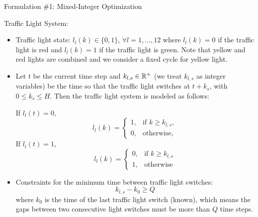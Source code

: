 \documentclass[9pt]{beamer}
\begin{document}
\begin{frame}{Formulation \#1: Mixed-Integer Optimization}

Traffic Light System:

\begin{itemize}
\item Traffic light state: $l_l(k) \in \{0, 1\}$, $\forall l = 1, \dots, 12$ where $l_l(k) = 0$ if the traffic light is red and $l_l(k) = 1$ if the traffic light is green.
Note that yellow and red lights are combined and we consider a fixed cycle for yellow light. 


\item Let $t$ be the current time step and $k_{l,s} \in \mathbb{R}^{+}$ (we treat $k_{l,s}$ as integer variables) be the time so that the traffic light switches at $t+k_s$, with $0 \le k_s \le H$. Then the traffic light system is modeled as follows:

If $l_l(t) = 0$,
\begin{equation*}
l_l (k) =
\begin{cases}
1, & \text{if } k \ge k_{l,s}, \\
0, & \text{otherwise,}
\end{cases}     
\end{equation*}
If $l_l(t) = 1$,
\begin{equation*}
l_l (k) =
\begin{cases}
0, & \text{if } k \ge k_{l,s} \\
1, & \text{otherwise}
\end{cases}     
\end{equation*}

\item Constraints for the minimum time between traffic light switches:
\begin{equation*}
\label{eq:min-swt}
k_{l,s} - k_0 \ge Q
\end{equation*}
where $k_0$ is the time of the last traffic light switch (known),
which means the gaps between two consecutive light switches must be more than $Q$ time steps.
\end{itemize}

\end{frame}
\end{document}
